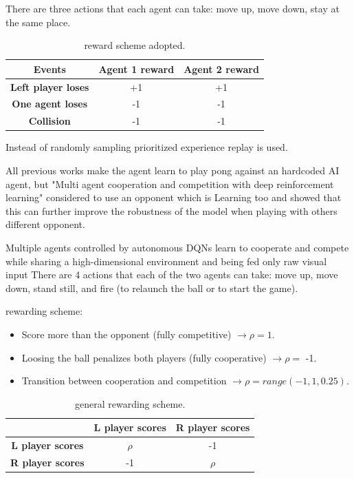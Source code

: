 There are three actions that each agent can take: move up, move down, stay at the same place.

\begin{table}[ht]
    \centering
    \begin{tabular}{@{}ccc@{}}
        \toprule
        \textbf{Events}            & \textbf{Agent 1 reward} & \textbf{Agent 2 reward} \\ \midrule
        \textbf{Left player loses} & +1                      & +1                      \\
        \textbf{One agent loses}   & -1                      & -1                      \\
        \textbf{Collision}         & -1                      & -1                      \\ \bottomrule
    \end{tabular}
    \label{my-table}
    \caption{reward scheme adopted.}
\end{table}

Instead of randomly sampling prioritized experience replay is used.




All previous works make the agent learn to play pong against an hardcoded AI agent, but "Multi agent cooperation and competition with deep reinforcement learning" considered to use an opponent
which is Learning too and showed that this can further improve the robustness of the model when playing with others different opponent.

Multiple agents controlled by autonomous DQNs learn to cooperate and compete while sharing a high-dimensional environment and being fed only raw visual input
There are 4 actions that each of the two agents can take: move up, move down, stand still, and fire (to relaunch the ball or to start the game).

 rewarding scheme:
\begin{itemize}
    \item Score more than the opponent (fully competitive) $\rightarrow \rho = 1$.
    \item Loosing the ball penalizes both players (fully cooperative) $\rightarrow \rho = $ -1.
    \item Transition between cooperation and competition $\rightarrow \rho = range(-1, 1, 0.25)$.
\end{itemize}

\begin{table}[ht]
    \centering
    \begin{tabular}{c|c|c|}
        \cline{2-3}
                                                       & \textbf{L player scores} & \textbf{R player scores} \\ \hline
        \multicolumn{1}{|c|}{\textbf{L player scores}} & $\rho$                   & -1                       \\ \hline
        \multicolumn{1}{|c|}{\textbf{R player scores}} & -1                       & $\rho$                   \\ \hline
    \end{tabular}
    \caption{general rewarding scheme.}
    \label{tab:my-table2}
\end{table}


